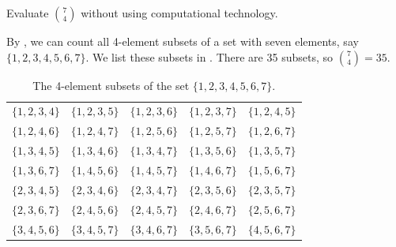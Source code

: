 \begin{exam}
\label{exam_eval_7choose4}
    Evaluate $\binom{7}{4}$ without using computational technology.
        \begin{soln}
            By , we can count all 4-element subsets of a set with seven elements, say $\{1,2,3,4,5,6,7\}$. We list these subsets in .  There are 35 subsets, so $\binom{7}{4}=35.$

                \begin{table}[hbtp]
                \centering
                \begin{tabular}{ccccc}
                    $\{1,2,3,4\}$ & 
                    $\{1,2,3,5\}$ &
                    $\{1,2,3,6\}$ &
                    $\{1,2,3,7\}$ &
                    $\{1,2,4,5\}$ \\
                    $\{1,2,4,6\}$ & 
                    $\{1,2,4,7\}$ &
                    $\{1,2,5,6\}$ &
                    $\{1,2,5,7\}$ &
                    $\{1,2,6,7\}$ \\
                    $\{1,3,4,5\}$ & 
                    $\{1,3,4,6\}$ &
                    $\{1,3,4,7\}$ &
                    $\{1,3,5,6\}$ &
                    $\{1,3,5,7\}$ \\
                    $\{1,3,6,7\}$ & 
                    $\{1,4,5,6\}$ &
                    $\{1,4,5,7\}$ &
                    $\{1,4,6,7\}$ &
                    $\{1,5,6,7\}$ \\
                    $\{2,3,4,5\}$ & 
                    $\{2,3,4,6\}$ &
                    $\{2,3,4,7\}$ &
                    $\{2,3,5,6\}$ &
                    $\{2,3,5,7\}$ \\
                    $\{2,3,6,7\}$ & 
                    $\{2,4,5,6\}$ &
                    $\{2,4,5,7\}$ &
                    $\{2,4,6,7\}$ &
                    $\{2,5,6,7\}$ \\
                    $\{3,4,5,6\}$ & 
                    $\{3,4,5,7\}$ &
                    $\{3,4,6,7\}$ &
                    $\{3,5,6,7\}$ &
                    $\{4,5,6,7\}$\\
                \end{tabular}
                \caption{The 4-element subsets of the set $\{1,2,3,4,5,6,7\}$.}
                \label{table_subset_list_7choose4}
            \end{table}
        \end{soln}
\end{exam}

